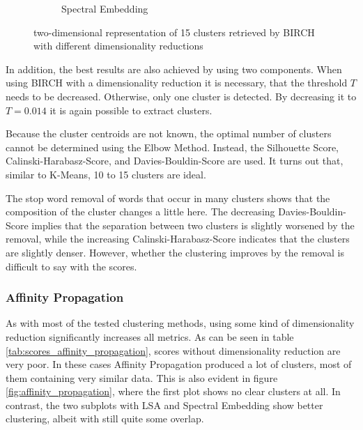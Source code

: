 \begin{figure}
\begin{subfigure}{.3\textwidth}
  \caption{Spectral Embedding}
  \label{fig:birch_spectral}
\end{subfigure}
\caption{two-dimensional representation of 15 clusters retrieved by BIRCH with different dimensionality reductions}
\label{fig:birch}
\end{figure}
In addition, the best results are also achieved by using two components.
When using BIRCH with a dimensionality reduction it is necessary, that the threshold $T$ needs to be decreased.
Otherwise, only one cluster is detected.
By decreasing it to $T=0.014$ it is again possible to extract clusters.

Because the cluster centroids are not known, the optimal number of clusters cannot be determined using the Elbow Method.
Instead, the Silhouette Score, Calinski-Harabasz-Score, and Davies-Bouldin-Score are used.
It turns out that, similar to K-Means, 10 to 15 clusters are ideal.

The stop word removal of words that occur in many clusters shows that the composition of the cluster changes a little here.
The decreasing Davies-Bouldin-Score implies that the separation between two clusters is slightly worsened by the removal, while the increasing Calinski-Harabasz-Score indicates that the clusters are slightly denser.
However, whether the clustering improves by the removal is difficult to say with the scores.

\subsubsection{Affinity Propagation}

As with most of the tested clustering methods, using some kind of dimensionality reduction significantly increases all metrics. As can be seen in table \ref{tab:scores_affinity_propagation}, scores without dimensionality reduction are very poor.
In these cases Affinity Propagation produced a lot of clusters, most of them containing very similar data. This is also evident in figure \ref{fig:affinity_propagation}, where the first plot shows no clear clusters at all. In contrast, the two subplots with LSA and Spectral Embedding show better clustering, albeit with still quite some overlap. 

